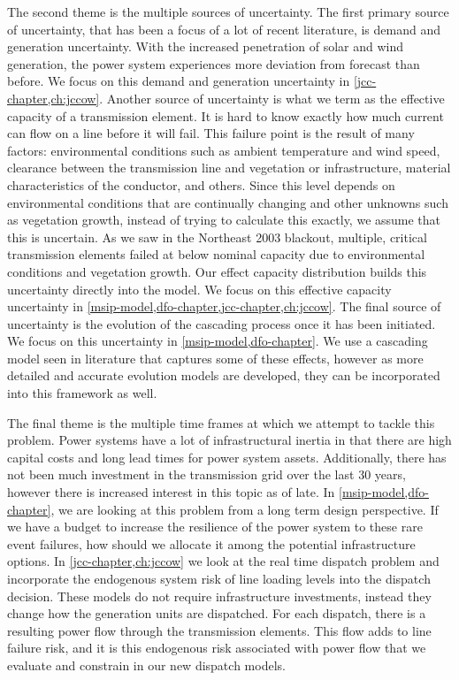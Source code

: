 The second theme is the multiple sources of uncertainty.  The first primary source of uncertainty, that has been a focus of a lot of recent literature, is demand and generation uncertainty.  With the increased penetration of solar and wind generation, the power system experiences more deviation from forecast than before.  We focus on this demand and generation uncertainty in \cref{jcc-chapter,ch:jccow}.  Another source of uncertainty is what we term as the effective capacity of a transmission element.  It is hard to know exactly how much current can flow on a line before it will fail.  This failure point is the result of many factors: environmental conditions such as ambient temperature and wind speed, clearance between the transmission line and vegetation or infrastructure, material characteristics of the conductor, and others.  Since this level depends on environmental conditions that are continually changing and other unknowns such as vegetation growth, instead of trying to calculate this exactly, we assume that this is uncertain.  As we saw in the Northeast 2003 blackout, multiple, critical transmission elements failed at below nominal capacity due to environmental conditions and vegetation growth.  Our effect capacity distribution builds this uncertainty directly into the model.  We focus on this effective capacity uncertainty in \cref{msip-model,dfo-chapter,jcc-chapter,ch:jccow}.  The final source of uncertainty is the evolution of the cascading process once it has been initiated.  We focus on this uncertainty in \cref{msip-model,dfo-chapter}.  We use a cascading model seen in literature that captures some of these effects, however as more detailed and accurate evolution models are developed, they can be incorporated into this framework as well.  

The final theme is the multiple time frames at which we attempt to tackle this problem.  Power systems have a lot of infrastructural inertia in that there are high capital costs and long lead times for power system assets.  Additionally, there has not been much investment in the transmission grid over the last 30 years, however there is increased interest in this topic as of late.  In \cref{msip-model,dfo-chapter}, we are looking at this problem from a long term design perspective.  If we have a budget to increase the resilience of the power system to these rare event failures, how should we allocate it among the potential infrastructure options.  In \cref{jcc-chapter,ch:jccow} we look at the real time dispatch problem and incorporate the endogenous system risk of line loading levels into the dispatch decision. These models do not require infrastructure investments, instead they change how the generation units are dispatched.  For each dispatch, there is a resulting power flow through the transmission elements.  This flow adds to line failure risk, and it is this endogenous risk associated with power flow that we evaluate and constrain in our new dispatch models.


